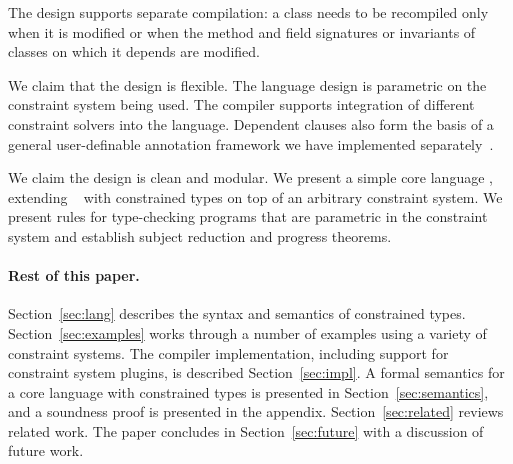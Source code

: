 The design supports separate compilation: a class needs to be
recompiled only when it is modified or when the method
and field signatures or invariants of classes on which it
depends are modified.

We claim that the design is flexible. The language design is
parametric on the constraint system being used.
The compiler supports
integration of
different constraint solvers into the language.
Dependent clauses  also form
the basis of a general user-definable annotation framework we have
implemented separately~\cite{ns07-x10anno}. 

We claim the design is clean and modular. We present a simple core
language \CFJ, extending \FJ{}~\cite{FJ} with constrained types on top
of an arbitrary constraint system. We present rules for type-checking
\CFJ{} programs that are parametric in the constraint system
and establish subject reduction and progress theorems. 

%

\paragraph{Rest of this paper.}

Section~\ref{sec:lang} describes the syntax and semantics of
constrained types.
Section~\ref{sec:examples} works through a number of
examples using a variety of constraint systems.
The compiler implementation, including support for constraint
system plugins, is described Section~\ref{sec:impl}.
A formal semantics for a core language with constrained types 
is presented in Section~\ref{sec:semantics}, and a soundness
proof is presented in the appendix.
Section~\ref{sec:related} reviews related work.
The paper concludes in Section~\ref{sec:future}
with a discussion of future work.



